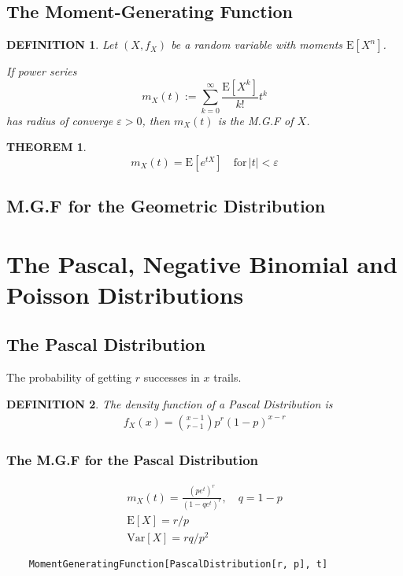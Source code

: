 \documentclass[11pt,a4paper]{article}
\newtheorem*{theorem}{\bf THEOREM}
\newtheorem*{definition}{\bf DEFINITION}
\begin{document}
\subsection{The Moment-Generating Function}
\begin{definition}
    Let $(X,f_X)$ be a random variable with moments $\mathrm{E}[X^n]$.

    If power series
    \[m_X(t):=\sum_{k=0}^{\infty}\frac{\mathrm{E}[X^k]}{k!}t^k\]
    \indent has radius of converge $\varepsilon>0$, then $m_X(t)$ is the M.G.F of $X$.
\end{definition}
\begin{theorem}
    \[m_X(t)=\mathrm{E}[e^{tX}]\quad \mathrm{for}\,|t|<\varepsilon\]
\end{theorem}

\subsection{M.G.F for the Geometric Distribution}

\section{The Pascal, Negative Binomial and Poisson Distributions}
\subsection{The Pascal Distribution}
The probability of getting $r$ successes in $x$ trails.
\begin{definition}
    The density function of a Pascal Distribution is
    \begin{gather*}
        f_X(x)=\binom{x-1}{r-1}p^r(1-p)^{x-r}
    \end{gather*}
\end{definition}
\subsubsection{The M.G.F for the Pascal Distribution}
\begin{gather*}
    m_X(t)=\frac{(pe^t)^r}{(1-qe^t)^r}, \quad q=1-p\\
    \mathrm{E}[X]=r/p\\
    \mathrm{Var}[X]=rq/p^2
\end{gather*}
\begin{verbatim}
    MomentGeneratingFunction[PascalDistribution[r, p], t]
\end{verbatim}
\end{document}
